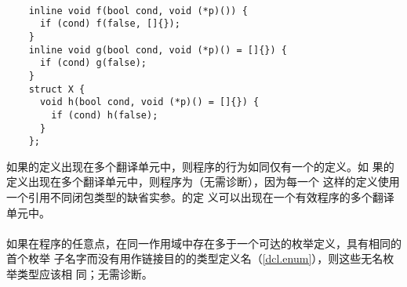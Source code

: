\paragraph{} %
\begin{example} %
  \begin{lstlisting}
    inline void f(bool cond, void (*p)()) {
      if (cond) f(false, []{});
    }
    inline void g(bool cond, void (*p)() = []{}) {
      if (cond) g(false);
    }
    struct X {
      void h(bool cond, void (*p)() = []{}) {
        if (cond) h(false);
      }
    };
  \end{lstlisting}
  如果的定义出现在多个翻译单元中，则程序的行为如同仅有一个的定义。如
  果的定义出现在多个翻译单元中，则程序为\illform{}（无需诊断），因为每一个
  这样的定义使用一个引用不同闭包类型的缺省实参。的定
  义可以出现在一个有效程序的多个翻译单元中。
\end{example}

\paragraph{} %
如果在程序的任意点，在同一作用域中存在多于一个可达的枚举定义，具有相同的首个枚举
子名字而没有用作链接目的的类型定义名（\ref{dcl.enum}），则这些无名枚举类型应该相
同；无需诊断。
